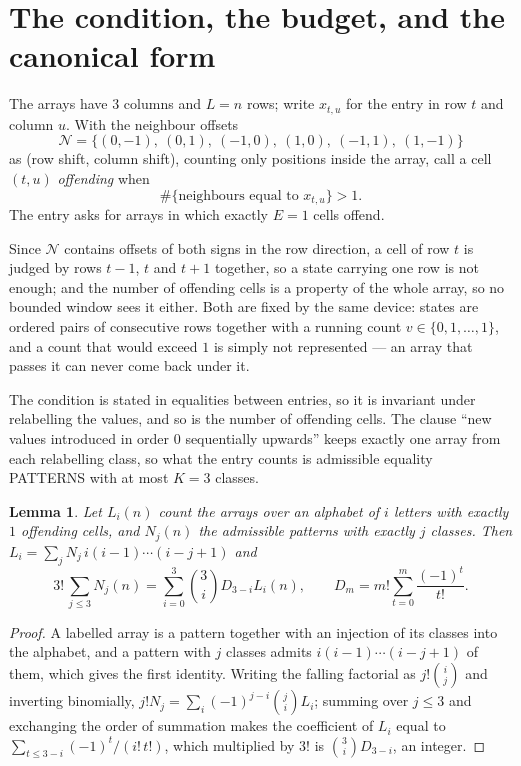 \documentclass[11pt,a4paper]{article}
\theoremstyle{plain}
\newtheorem{lemma}[theorem]{Lemma}
\theoremstyle{definition}
\begin{document}
\section{The condition, the budget, and the canonical form}

The arrays have $3$ columns and $L=n$ rows; write $x_{t,u}$ for the entry in
row $t$ and column $u$. With the neighbour offsets
\[
\mathcal N=\{(0,-1),\ (0,1),\ (-1,0),\ (1,0),\ (-1,1),\ (1,-1)\}
\]
as (row shift, column shift), counting only positions inside the array, call a cell
$(t,u)$ \emph{offending} when
\[
\#\{\text{neighbours equal to }x_{t,u}\}>1 .
\]
The entry asks for arrays in which exactly $E=1$ cells offend.

Since $\mathcal N$ contains offsets of both signs in the row direction, a cell of row
$t$ is judged by rows $t-1$, $t$ and $t+1$ together, so a state carrying one row is not
enough; and the number of offending cells is a property of the whole array, so no bounded
window sees it either. Both are fixed by the same device: states are ordered pairs of
consecutive rows together with a running count $v\in\{0,1,\dots,1\}$, and a count that
would exceed $1$ is simply not represented --- an array that passes it can never come back
under it.

The condition is stated in equalities between entries, so it is invariant under relabelling
the values, and so is the number of offending cells. The clause ``new values introduced in
order $0$ sequentially upwards'' keeps exactly one array from each relabelling class, so what
the entry counts is admissible equality PATTERNS with at most $K=3$ classes.

\begin{lemma}\label{lem:inv}
Let $L_i(n)$ count the arrays over an alphabet of $i$ letters with exactly $1$ offending
cells, and $N_j(n)$ the admissible patterns with exactly $j$ classes. Then
$L_i=\sum_j N_j\,i(i-1)\cdots(i-j+1)$ and
\[
3!\,\sum_{j\le3}N_j(n)=\sum_{i=0}^{3}\binom{3}{i}D_{3-i}L_i(n),
\qquad D_m=m!\sum_{t=0}^{m}\frac{(-1)^t}{t!} .
\]
\end{lemma}

\begin{proof}
A labelled array is a pattern together with an injection of its classes into the alphabet,
and a pattern with $j$ classes admits $i(i-1)\cdots(i-j+1)$ of them, which gives the first
identity. Writing the falling factorial as $j!\binom{i}{j}$ and inverting binomially,
$j!N_j=\sum_i(-1)^{j-i}\binom{j}{i}L_i$; summing over $j\le3$ and exchanging the
order of summation makes the coefficient of $L_i$ equal to
$\sum_{t\le3-i}(-1)^t/(i!\,t!)$, which multiplied by $3!$ is
$\binom{3}{i}D_{3-i}$, an integer.
\end{proof}
\end{document}
